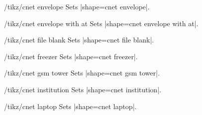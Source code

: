 \documentclass[a4paper]{ltxdoc}
\begin{document}
\begin{stylekey}{/tikz/cnet envelope}
Sets |shape={cnet envelope}|.
\begin{codeexample}[preamble={\usetikzlibrary{shapes.cnet.envelope}}]
\end{codeexample}
\end{stylekey}

\begin{stylekey}{/tikz/cnet envelope with at}
Sets |shape={cnet envelope with at}|.
\begin{codeexample}[preamble={\usetikzlibrary{shapes.cnet.envelopewithat}}]
\end{codeexample}
\end{stylekey}

\begin{stylekey}{/tikz/cnet file blank}
Sets |shape={cnet file blank}|.
\begin{codeexample}[preamble={\usetikzlibrary{shapes.cnet.fileblank}}]
\end{codeexample}
\end{stylekey}

\begin{stylekey}{/tikz/cnet freezer}
Sets |shape={cnet freezer}|.
\begin{codeexample}[preamble={\usetikzlibrary{shapes.cnet.freezer}}]
\end{codeexample}
\end{stylekey}

\begin{stylekey}{/tikz/cnet gsm tower}
Sets |shape={cnet gsm tower}|.
\begin{codeexample}[preamble={\usetikzlibrary{shapes.cnet.gsmtower}}]
\end{codeexample}
\end{stylekey}

\begin{stylekey}{/tikz/cnet institution}
Sets |shape={cnet institution}|.
\begin{codeexample}[preamble={\usetikzlibrary{shapes.cnet.institution}}]
\end{codeexample}
\end{stylekey}

\begin{stylekey}{/tikz/cnet laptop}
Sets |shape={cnet laptop}|.
\begin{codeexample}[preamble={\usetikzlibrary{shapes.cnet.laptop}}]
\end{codeexample}
\end{stylekey}
\end{document}
